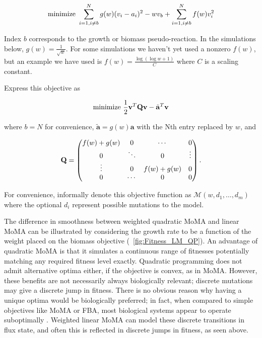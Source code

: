 \[ \textnormal{minimize}\ \sum^N_{i=1,i\ne b}g(w)(v_i-a_i)^2 - w v_b + \sum^N_{i=1,i\ne b}f(w)v^2_i \]

Index $b$ corresponds to the growth or biomass pseudo-reaction.  In
the simulations below, $g(w) = \frac{1}{\sqrt{w}}$. For some
simulations we haven't yet used a nonzero $f(w)$, but an example we
have used is $f(w) = \frac{\log{(\log{w}+1)}}{C}$ where $C$ is a
scaling constant.

  
Express this objective as

\[ \textnormal{minimize}\ \frac{1}{2}\mathbf{v}^T \mathbf{Q v} - \tilde{\mathbf{a}}^T \mathbf{v}\]

where $b = N$ for convenience, $\tilde{\mathbf{a}} = g(w)\mathbf{a}$
with the Nth entry replaced by $w$, and

\[ \mathbf{Q} = \begin{pmatrix}
f(w)+g(w) & 0       & \cdots    & 0 \\
0         & \ddots  & 0         & \vdots \\
\vdots    & 0       & f(w)+g(w) & 0 \\
0         & \cdots  & 0         & 0  
\end{pmatrix}\textnormal{.}\]

For convenience, informally denote this objective function as
$\mathcal{M}(w,d_1,\dots,d_m)$ where the optional $d_i$ represent
possible mutations to the model.

The difference in smoothness between weighted quadratic MoMA and linear
MoMA can be illustrated by considering the growth rate to be a
function of the weight placed on the biomass objective
(\Fig~\ref{fig:Fitness_LM_QP}).  An advantage of quadratic MoMA is
that it simulates a continuous range of fitnesses 
potentially matching any required fitness level exactly.  Quadratic
programming does not admit alternative optima either, if the objective
is convex, as in MoMA. However, these benefits are not necessarily
always biologically relevant; discrete mutations may give a discrete
jump in fitness. There is no obvious reason why having a unique optima
would be biologically preferred; in fact, when compared to simple
objectives like MoMA or FBA, most biological systems appear to operate
suboptimally \citep{Schuetz2012}. Weighted linear MoMA can model these
discrete transitions in flux state, and often this is reflected in
discrete jumps in fitness, as seen above.

